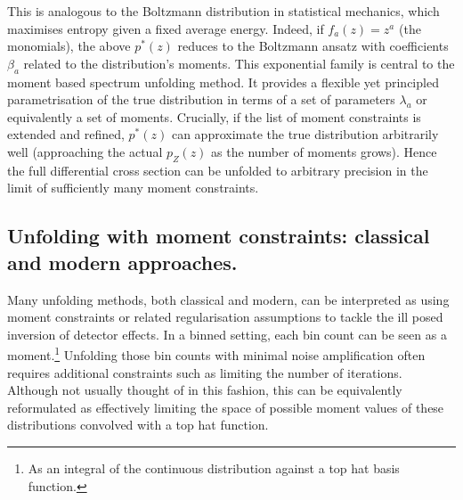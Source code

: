 {{            This is analogous to the Boltzmann distribution in statistical mechanics, which maximises entropy given a fixed average energy.
            Indeed, if $f_a(z) = z^a$ (the monomials), the above $p^*(z)$ reduces to the Boltzmann ansatz with coefficients $\beta_a$ related to the distribution's moments.
            This exponential family is central to the moment based spectrum unfolding method.
            It provides a flexible yet principled parametrisation of the true distribution in terms of a set of parameters ${\lambda_a}$ or equivalently a set of moments.
            Crucially, if the list of moment constraints is extended and refined, $p^*(z)$ can approximate the true distribution arbitrarily well (approaching the actual $p_Z(z)$ as the number of moments grows).
            Hence the full differential cross section can be unfolded to arbitrary precision in the limit of sufficiently many moment constraints.

    \subsection{Unfolding with moment constraints: classical and modern approaches.}
        Many unfolding methods, both classical and modern, can be interpreted as using moment constraints or related regularisation assumptions to tackle the ill posed inversion of detector effects.
        In a binned setting, each bin count can be seen as a moment.\footnote{As an integral of the continuous distribution against a top hat basis function.}
        Unfolding those bin counts with minimal noise amplification often requires additional constraints such as limiting the number of iterations.
        Although not usually thought of in this fashion, this can be equivalently reformulated as effectively limiting the space of possible moment values of these distributions convolved with a top hat function.
        
}}
